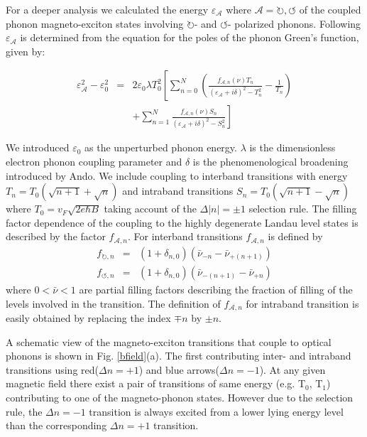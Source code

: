 \documentclass[prl,aps,superscriptaddress,showpacs,reprint]{revtex4-1}
\begin{document}
For a deeper analysis we calculated the energy $\varepsilon_{\mathcal{A}}$ where $\mathcal{A}=\circlearrowright,\circlearrowleft$ of the coupled phonon magneto-exciton states involving $\circlearrowright$- and $\circlearrowleft$- polarized phonons. Following \cite{goerbig2007filling,ando2007magnetic,kossacki2012circular} $\varepsilon_{\mathcal{A}}$ is determined from the equation for the poles of the phonon Green’s function, given by:  

\begin{eqnarray}
\label{greens-full}
\varepsilon_{\mathcal{A}}^2-\varepsilon_0^2 &=& 2\varepsilon_0 \lambda T_0^2 \left[ \sum_{n=0}^N\left(\frac{f_{\mathcal{A},n}\left(\nu\right) T_n}{\left(\varepsilon_{\mathcal{A}}+i\delta\right)^2-T_n^2}-\frac{1}{T_n}\right)\right.\nonumber \\
& &\left. +\sum_{n=1}^{N}\frac{f_{\mathcal{A},n}\left(\nu\right) S_n}{\left(\varepsilon_{\mathcal{A}}+i\delta\right)^2-S_n^2}\right]
\end{eqnarray}

We introduced $\varepsilon_0$ as the unperturbed phonon energy. $\lambda$ is the dimensionless electron phonon coupling parameter and $\delta$ is the phenomenological broadening introduced by Ando\cite{ando2007magnetic}. We include coupling to interband transitions with energy $T_n=T_0\left(\sqrt{n+1}+\sqrt{n}\right)$ and intraband transitions $S_n=T_0\left(\sqrt{n+1}-\sqrt{n}\right)$ where $T_0=v_F\sqrt{2e\hbar B}$ taking account of the $\Delta\left|n\right|=\pm 1$ selection rule. The filling factor dependence of the coupling to the highly degenerate Landau level states is described by the factor $f_{\mathcal{A},n}$. For interband transitions $f_{\mathcal{A},n}$ is defined by
\begin{eqnarray}
\label{fterm}
f_{\circlearrowright,n}&=&(1+\delta_{n,0})(\bar{\nu}_{-n}-\bar{\nu}_{+(n+1)})\nonumber\\
f_{\circlearrowleft,n}&=&(1+\delta_{n,0})(\bar{\nu}_{-(n+1)}-\bar{\nu}_{+n})
\end{eqnarray}
where $0<\bar{\nu}<1$ are partial filling factors describing the fraction of filling of the levels involved in the transition. The definition of $f_{\mathcal{A},n}$ for intraband transition is easily obtained by replacing the index $\mp n$ by $\pm n$.

A schematic view of the magneto-exciton transitions that couple to optical phonons is shown in Fig. \ref{bfield}(a). The first contributing inter- and intraband transitions using red($\Delta n = +1$) and blue arrows($\Delta n = -1$). At any given magnetic field there exist a pair of transitions of same energy (e.g. T$_0$, T$_1$) contributing to one of the magneto-phonon states. However due to the selection rule, the $\Delta n = -1$ transition is always excited from a lower lying energy level than the corresponding $\Delta n = +1$ transition.
\end{document}
